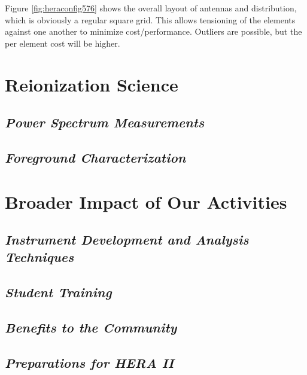 \documentclass[preprint]{aastex}
\begin{document}
Figure \ref{fig:heraconfig576} shows the overall layout of antennas and distribution, which is obviously a regular square grid.  This allows tensioning of the elements against one another to minimize cost/performance.  Outliers are possible, but the per element cost will be higher.


\section{Reionization Science}

\subsection{\it{Power Spectrum Measurements}}

\subsection{\it{Foreground Characterization}}

\section{Broader Impact of Our Activities}

\subsection{\it Instrument Development and Analysis Techniques}

\subsection{\it Student Training}

\subsection{\it Benefits to the Community}

\subsection{\it Preparations for HERA II}
\end{document}

